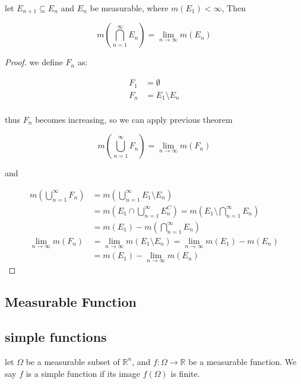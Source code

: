 \begin{corollary}
    let $E_{n+1} \subseteq E_{n}$ and $E_n$ be measurable, where $m(E_1) < \infty$,
    Then

    \[
        m\left(\bigcap_{n=1}^{\infty}E_n \right) = \lim_{n \to \infty}m(E_n)
    \]
\end{corollary}

\begin{proof}
    we define $F_n$ as:

    \begin{align*}
        F_1 &= \emptyset \\
        F_n &= E_1 \setminus E_n \\
    \end{align*}

    thus $F_n$ becomes increasing, so we can apply previous theorem

    \[
        m\left(\bigcup_{n=1}^{\infty}F_n\right) = \lim_{n\to \infty}m(F_n)
    \]

    and

    \begin{align*}
        m\left(\bigcup_{n=1}^{\infty}F_n\right) &= m\left(\bigcup_{n=1}^{\infty}E_1 \setminus E_n \right) \\
        &= m\left(E_1 \cap \bigcup_{n=1}^{\infty} E_n^C \right) = m\left(E_1 \setminus \bigcap_{n=1}^{\infty} E_n \right) \\
        &= m(E_1) - m\left(\bigcap_{n=1}^{\infty} E_n \right) \\
        \lim_{n \to \infty}m(F_n) &= \lim_{n \to \infty}m(E_1 \setminus E_n) = \lim_{n \to \infty}m(E_1)- m(E_n) \\
        &= m(E_1) - \lim_{n \to \infty}m(E_n)
    \end{align*}
\end{proof}

\subsection{Measurable Function}

\subsection{simple functions}

\begin{definition}
    let $\Omega$ be a measurable subset of $\mathbb{R}^n$, and $f: \Omega \to \mathbb{R}$
    be a measurable function. We say $f$ is a simple function if its image $f(\Omega)$ is finite.
\end{definition}

